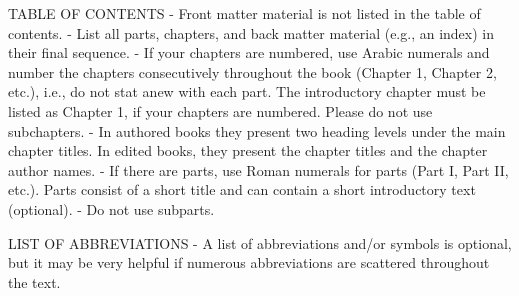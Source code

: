 TABLE OF CONTENTS
- Front matter material is not listed in the table of contents.
- List all parts, chapters, and back matter material (e.g., an index) in their final sequence.
- If your chapters are numbered, use Arabic numerals and number the chapters consecutively throughout the book (Chapter 1, Chapter 2, etc.), i.e., do not stat anew with each part. The introductory chapter must be listed as Chapter 1, if your chapters are numbered. Please do not use subchapters.
- In authored books they present two heading levels under the main chapter titles. In edited books, they present the chapter titles and the chapter author names.
- If there are parts, use Roman numerals for parts (Part I, Part II, etc.). Parts consist of a short title and can contain a short introductory text (optional).
- Do not use subparts.

LIST OF ABBREVIATIONS
- A list of abbreviations and/or symbols is optional, but it may be very helpful if numerous abbreviations are scattered throughout the text.























